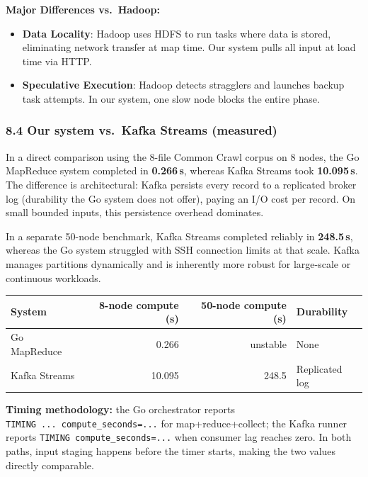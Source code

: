 \documentclass[
]{article}
\providecommand{\tightlist}{%
  \setlength{\itemsep}{0pt}\setlength{\parskip}{0pt}}
\begin{document}
\textbf{Major Differences vs.~Hadoop:}
\begin{itemize}
\tightlist
\item \textbf{Data Locality}: Hadoop uses HDFS to run tasks where data is
  stored, eliminating network transfer at map time. Our system pulls all
  input at load time via HTTP.
\item \textbf{Speculative Execution}: Hadoop detects stragglers and launches
  backup task attempts. In our system, one slow node blocks the entire phase.
\end{itemize}


\subsubsection{8.4 Our system vs.\ Kafka Streams (measured)}\label{vs-kafka}

In a direct comparison using the 8-file Common Crawl corpus on 8 nodes, the
Go MapReduce system completed in \textbf{0.266\,s}, whereas Kafka Streams took
\textbf{10.095\,s}. The difference is architectural: Kafka persists every
record to a replicated broker log (durability the Go system does not offer),
paying an I/O cost per record. On small bounded inputs, this persistence
overhead dominates.

In a separate 50-node benchmark, Kafka Streams completed reliably in
\textbf{248.5\,s}, whereas the Go system struggled with SSH connection limits
at that scale. Kafka manages partitions dynamically and is inherently more
robust for large-scale or continuous workloads.

\begin{center}\small
\begin{tabular}{l r r l}
\toprule
\textbf{System} & \textbf{8-node compute (s)} & \textbf{50-node compute (s)} & \textbf{Durability} \\
\midrule
Go MapReduce  & 0.266   & unstable & None \\
Kafka Streams & 10.095  & 248.5    & Replicated log \\
\bottomrule
\end{tabular}
\end{center}

\textbf{Timing methodology:} the Go orchestrator reports
\texttt{TIMING\ ...\ compute\_seconds=...} for map+reduce+collect; the Kafka
runner reports \texttt{TIMING\ compute\_seconds=...} when consumer lag reaches
zero. In both paths, input staging happens before the timer starts, making the
two values directly comparable.
\end{document}
